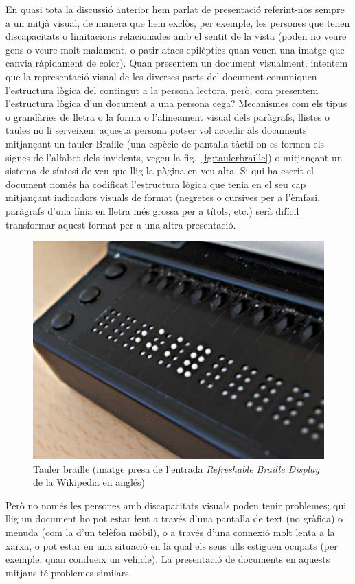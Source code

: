 En quasi tota la discussió anterior hem parlat de presentació
referint-nos sempre a un mitjà visual, de manera que hem exclòs, per
exemple, les persones que tenen discapacitats o limitacions
relacionades amb el sentit de la vista (poden no veure gens o veure
molt malament, o patir atacs epilèptics quan veuen una imatge que
canvia ràpidament de color).  Quan presentem un document visualment,
intentem que la representació visual de les diverses parts del
document comuniquen l'estructura lògica del contingut a la persona
lectora, però, com presentem l'estructura lògica d'un document a una
persona cega?  Mecanismes com els tipus o grandàries de lletra o la
forma o l'alineament visual dels paràgrafs, llistes o taules no li
serveixen; aquesta persona potser vol accedir als documents mitjançant
un tauler Braille (una espècie de pantalla tàctil on es formen els
signes de l'alfabet dels invidents, vegeu la
fig.~\ref{fg:taulerbraille}) o mitjançant un sistema de síntesi de veu
que llig la pàgina en veu alta.  Si qui ha escrit el document només ha
codificat l'estructura lògica que tenia en el seu cap mitjançant
indicadors visuals de format (negretes o cursives per a l'èmfasi,
paràgrafs d'una línia en lletra més grossa per a títols, etc.) serà
difícil transformar aquest format per a una altra presentació.
\begin{figure}
  \centering
  \includegraphics[scale=0.5]{Refreshable_Braille_display.jpg}
  \caption{Tauler braille (imatge presa de l'entrada \emph{Refreshable Braille Display} de la Wikipedia en anglés)}
\end{figure}

Però no només les persones amb discapacitats visuals poden tenir
problemes; qui llig un document ho pot estar fent a través d'una
pantalla de text (no gràfica) o menuda (com la d'un telèfon mòbil), o
a través d'una connexió molt lenta a la xarxa, o pot estar en una
situació en la qual els seus ulls estiguen ocupats (per exemple, quan
condueix un vehicle). La presentació de documents en aquests mitjans
té problemes similars.


